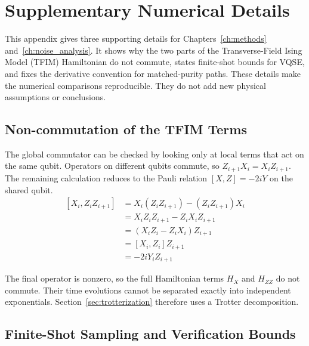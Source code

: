 \chapter{Supplementary Numerical Details}
\label{app:noise_analysis}

This appendix gives three supporting details for Chapters~\ref{ch:methods} and~\ref{ch:noise_analysis}.  It shows why the two parts of the Transverse-Field Ising Model (TFIM) Hamiltonian do not commute, states finite-shot bounds for VQSE, and fixes the derivative convention for matched-purity paths.  These details make the numerical comparisons reproducible.  They do not add new physical assumptions or conclusions.


\section{Non-commutation of the TFIM Terms}
\label{app:non_commutation}

The global commutator can be checked by looking only at local terms that act on the same qubit.  Operators on different qubits commute, so $Z_{i+1}X_i=X_iZ_{i+1}$.  The remaining calculation reduces to the Pauli relation $[X,Z]=-2iY$ on the shared qubit.
\begin{equation}
    \begin{aligned}
        [X_i, Z_iZ_{i+1}]
         & = X_i (Z_i Z_{i+1}) - (Z_i Z_{i+1}) X_i \\
         & = X_i Z_i Z_{i+1} - Z_i X_i Z_{i+1}     \\
         & = (X_i Z_i - Z_i X_i) Z_{i+1}           \\
         & = [X_i, Z_i] Z_{i+1}                    \\
         & = -2iY_i Z_{i+1}
    \end{aligned}
\end{equation}

The final operator is nonzero, so the full Hamiltonian terms $H_X$ and $H_{ZZ}$ do not commute.  Their time evolutions cannot be separated exactly into independent exponentials.  Section~\ref{sec:trotterization} therefore uses a Trotter decomposition.


\section{Finite-Shot Sampling and Verification Bounds}
\label{appendix:finite_shot_sampling}

